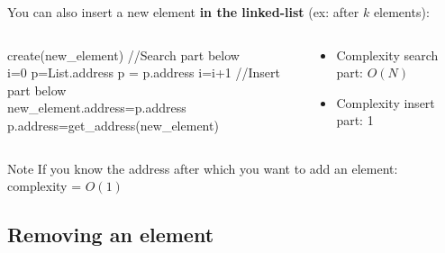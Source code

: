 \documentclass{beamer}[10pt, usepdftitle=false, handout]
\begin{document}
	\begin{frame}
	
	You can also insert a new element \textbf{in the linked-list} (ex: after $k$ elements):
	
	\begin{columns}[c]
	\begin{center}    
    \scalebox{0.75} {
    \begin{algorithm}[H]
    create(new\_element)\;
  	\vspace*{1em}
    //Search part below \\
    i=0\;  
    p=List.address\;
     {
		p = p.address\;
		i=i+1\;
	}
	\vspace*{1em}
	//Insert part below \\ 
	new\_element.address=p.address\;
    p.address=get\_address(new\_element)\;
	\end{algorithm}	
	}
	\end{center}
	\begin{center}
	\begin{itemize}
		\item {Complexity search part: $O(N)$}
		\item {Complexity insert part: 1}
	\end{itemize}	
	\end{center}
	\end{columns}	
		
	\pause
	
	\begin{block}{Note}
	If you know the address after which you want to add an element: complexity = $O(1)$
	\end{block}		
		
	
	\end{frame}
	
	\subsection{Removing an element}	
	
\end{document}

